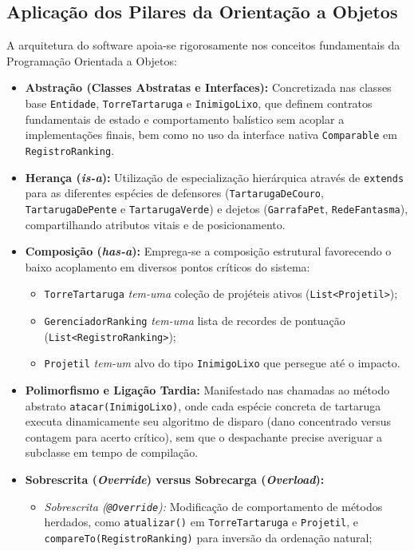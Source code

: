 \documentclass[11pt,a4paper]{article}
\begin{document}
\subsection*{Aplicação dos Pilares da Orientação a Objetos}
A arquitetura do software apoia-se rigorosamente nos conceitos fundamentais da Programação Orientada a Objetos:
\begin{itemize}
    \item \textbf{Abstração (Classes Abstratas e Interfaces):} Concretizada nas classes base \texttt{Entidade}, \texttt{TorreTartaruga} e \texttt{InimigoLixo}, que definem contratos fundamentais de estado e comportamento balístico sem acoplar a implementações finais, bem como no uso da interface nativa \texttt{Comparable} em \texttt{RegistroRanking}.
    \item \textbf{Herança (\textit{is-a}):} Utilização de especialização hierárquica através de \texttt{extends} para as diferentes espécies de defensores (\texttt{TartarugaDeCouro}, \texttt{TartarugaDePente} e \texttt{TartarugaVerde}) e dejetos (\texttt{GarrafaPet}, \texttt{RedeFantasma}), compartilhando atributos vitais e de posicionamento.
    \item \textbf{Composição (\textit{has-a}):} Emprega-se a composição estrutural favorecendo o baixo acoplamento em diversos pontos críticos do sistema:
    \begin{itemize}
        \item \texttt{TorreTartaruga} \textit{tem-uma} coleção de projéteis ativos (\texttt{List<Projetil>});
        \item \texttt{GerenciadorRanking} \textit{tem-uma} lista de recordes de pontuação (\texttt{List<RegistroRanking>});
        \item \texttt{Projetil} \textit{tem-um} alvo do tipo \texttt{InimigoLixo} que persegue até o impacto.
    \end{itemize}
    \item \textbf{Polimorfismo e Ligação Tardia:} Manifestado nas chamadas ao método abstrato \texttt{atacar(InimigoLixo)}, onde cada espécie concreta de tartaruga executa dinamicamente seu algoritmo de disparo (dano concentrado versus contagem para acerto crítico), sem que o despachante precise averiguar a subclasse em tempo de compilação.
    \item \textbf{Sobrescrita (\textit{Override}) versus Sobrecarga (\textit{Overload}):}
    \begin{itemize}
        \item \textit{Sobrescrita (\texttt{@Override}):} Modificação de comportamento de métodos herdados, como \texttt{atualizar()} em \texttt{TorreTartaruga} e \texttt{Projetil}, e \texttt{compareTo(RegistroRanking)} para inversão da ordenação natural;

\end{itemize}
\end{itemize}
\end{document}
